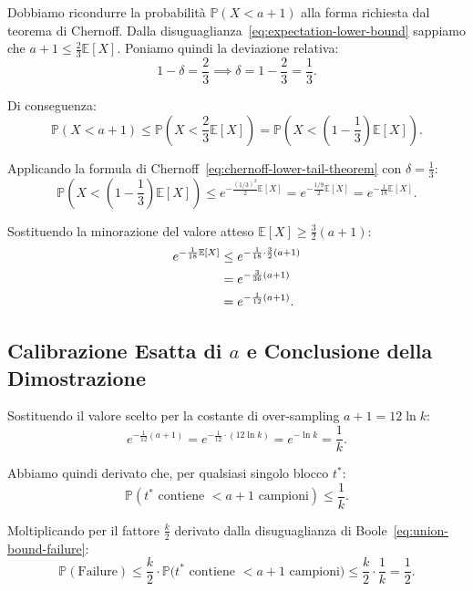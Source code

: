 Dobbiamo ricondurre la probabilità $\mathbb{P}(X < a + 1)$ alla forma richiesta dal teorema di Chernoff. Dalla disuguaglianza~\eqref{eq:expectation-lower-bound} sappiamo che $a + 1 \le \frac{2}{3}\mathbb{E}[X]$. Poniamo quindi la deviazione relativa:
\begin{equation}
  1 - \delta = \frac{2}{3} \implies \delta = 1 - \frac{2}{3} = \frac{1}{3}.
\end{equation}

Di conseguenza:
\begin{equation}
  \mathbb{P}(X < a + 1) \le \mathbb{P}\left(X < \frac{2}{3}\mathbb{E}[X]\right) = \mathbb{P}\left(X < \left(1 - \frac{1}{3}\right)\mathbb{E}[X]\right).
\end{equation}

Applicando la formula di Chernoff~\eqref{eq:chernoff-lower-tail-theorem} con $\delta = \frac{1}{3}$:
\begin{equation}
  \mathbb{P}\left(X < \left(1 - \frac{1}{3}\right)\mathbb{E}[X]\right) \le e^{-\frac{(1/3)^2}{2}\mathbb{E}[X]} = e^{-\frac{1/9}{2}\mathbb{E}[X]} = e^{-\frac{1}{18}\mathbb{E}[X]}.
\end{equation}

Sostituendo la minorazione del valore atteso $\mathbb{E}[X] \ge \frac{3}{2}(a + 1)$:
\begin{align}
  e^{-\frac{1}{18}\mathbb{E}[X]} &\le e^{-\frac{1}{18} \cdot \frac{3}{2}(a + 1)} \notag\\
  &= e^{-\frac{3}{36}(a + 1)} \notag\\
  &= e^{-\frac{1}{12}(a + 1)}.
\end{align}

\subsection{Calibrazione Esatta di \texorpdfstring{$a$}{a} e Conclusione della Dimostrazione}
Sostituendo il valore scelto per la costante di over-sampling $a + 1 = 12 \ln k$:
\begin{equation}
  e^{-\frac{1}{12}(a + 1)} = e^{-\frac{1}{12} \cdot (12 \ln k)} = e^{-\ln k} = \frac{1}{k}.
\end{equation}

Abbiamo quindi derivato che, per qualsiasi singolo blocco $t^*$:
\begin{equation}
  \mathbb{P}(t^* \text{ contiene } < a + 1 \text{ campioni}) \le \frac{1}{k}.
\end{equation}

Moltiplicando per il fattore $\frac{k}{2}$ derivato dalla disuguaglianza di Boole~\eqref{eq:union-bound-failure}:
\begin{equation}
  \mathbb{P}(\text{Failure}) \le \frac{k}{2} \cdot \mathbb{P}\big(t^* \text{ contiene } < a + 1 \text{ campioni}\big) \le \frac{k}{2} \cdot \frac{1}{k} = \frac{1}{2}.
\end{equation}

